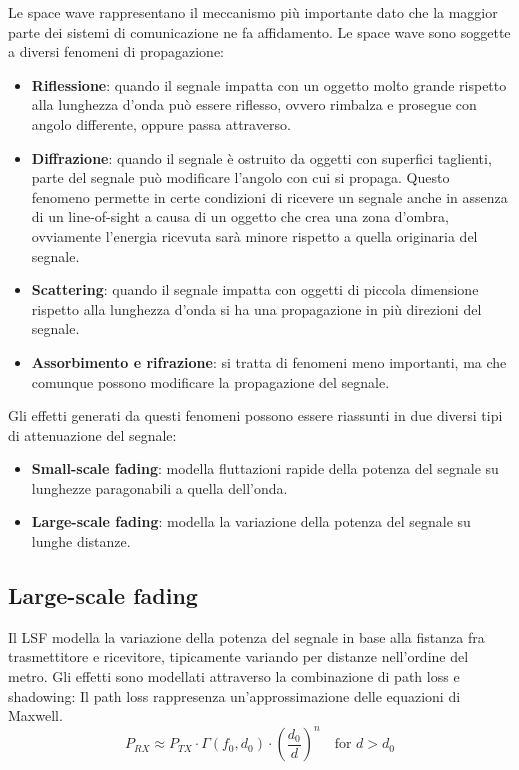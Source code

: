 Le space wave rappresentano il meccanismo più importante dato che la maggior parte dei sistemi di comunicazione ne fa affidamento. Le space wave sono soggette a diversi fenomeni di propagazione:
\begin{itemize}
    \item \textbf{Riflessione}: quando il segnale impatta con un oggetto molto grande rispetto alla lunghezza d'onda può essere riflesso, ovvero rimbalza e prosegue con angolo differente, oppure passa attraverso.
    \item \textbf{Diffrazione}: quando il segnale è ostruito da oggetti con superfici taglienti, parte del segnale può modificare l'angolo con cui si propaga. Questo fenomeno permette in certe condizioni di ricevere un segnale anche in assenza di un line-of-sight a causa di un oggetto che crea una zona d'ombra, ovviamente l'energia ricevuta sarà minore rispetto a quella originaria del segnale.
    \item \textbf{Scattering}: quando il segnale impatta con oggetti di piccola dimensione rispetto alla lunghezza d'onda si ha una propagazione in più direzioni del segnale.
    \item \textbf{Assorbimento e rifrazione}: si tratta di fenomeni meno importanti, ma che comunque possono modificare la propagazione del segnale. 
\end{itemize}

Gli effetti generati da questi fenomeni possono essere riassunti in due diversi tipi di attenuazione del segnale:
\begin{itemize}
    \item \textbf{Small-scale fading}: modella fluttazioni rapide della potenza del segnale su lunghezze paragonabili a quella dell'onda.
    \item \textbf{Large-scale fading}: modella la variazione della potenza del segnale su lunghe distanze.
\end{itemize}


\subsection*{Large-scale fading}
Il LSF modella la variazione della potenza del segnale in base alla fistanza fra trasmettitore e ricevitore, tipicamente variando per distanze nell'ordine del metro. Gli effetti sono modellati attraverso la combinazione di path loss e shadowing:
Il path loss rappresenza un'approssimazione delle equazioni di Maxwell.
\begin{equation}
    P_{RX} \approx P_{TX} \cdot \Gamma(f_0, d_0) \cdot \left( \frac{d_0}{d} \right)^n \quad \text{for } d > d_0
\end{equation}


